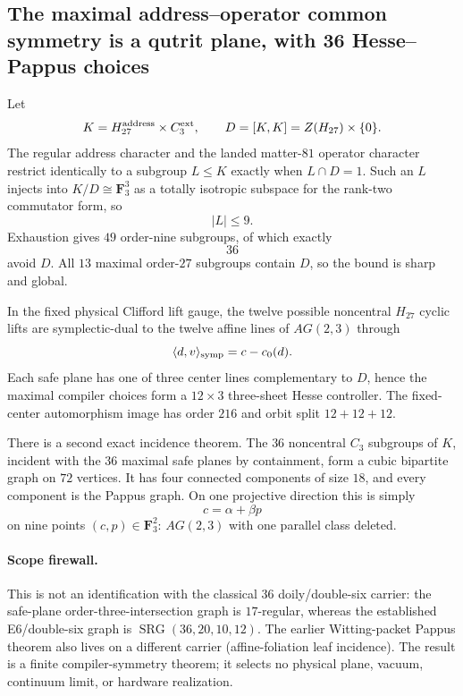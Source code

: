 \subsection*{The maximal address--operator common symmetry is a qutrit plane, with 36 Hesse--Pappus choices}

Let
\[
K=H_{27}^{\rm address}\times C_3^{\rm ext},
\qquad
D=[K,K]=Z(H_{27})\times\{0\}.
\]
The regular address character and the landed matter-$81$ operator character
restrict identically to a subgroup $L\le K$ exactly when $L\cap D=1$.
Such an $L$ injects into $K/D\cong\mathbf F_3^3$ as a totally isotropic
subspace for the rank-two commutator form, so
\[
\boxed{|L|\le 9.}
\]
Exhaustion gives $49$ order-nine subgroups, of which exactly
\[
\boxed{36}
\]
avoid $D$.  All $13$ maximal order-$27$ subgroups contain $D$, so the bound is
sharp and global.

In the fixed physical Clifford lift gauge, the twelve possible noncentral
$H_{27}$ cyclic lifts are symplectic-dual to the twelve affine lines of
$AG(2,3)$ through
\[
\langle d,v\rangle_{\rm symp}=c-c_0(d).
\]
Each safe plane has one of three center lines complementary to $D$, hence the
maximal compiler choices form a $12\times3$ three-sheet Hesse controller.
The fixed-center automorphism image has order $216$ and orbit split
$12+12+12$.

There is a second exact incidence theorem.  The $36$ noncentral $C_3$
subgroups of $K$, incident with the $36$ maximal safe planes by containment,
form a cubic bipartite graph on $72$ vertices.  It has four connected
components of size $18$, and every component is the Pappus graph.  On one
projective direction this is simply
\[
c=\alpha+\beta p
\]
on nine points $(c,p)\in\mathbf F_3^2$: $AG(2,3)$ with one parallel class
deleted.

\paragraph{Scope firewall.}
This is not an identification with the classical $36$ doily/double-six
carrier: the safe-plane order-three-intersection graph is $17$-regular,
whereas the established E6/double-six graph is
$\operatorname{SRG}(36,20,10,12)$.  The earlier Witting-packet Pappus theorem
also lives on a different carrier (affine-foliation leaf incidence).
The result is a finite compiler-symmetry theorem; it selects no physical plane,
vacuum, continuum limit, or hardware realization.
